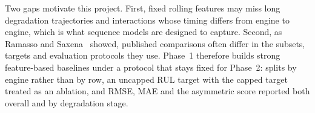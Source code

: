 Two gaps motivate this project. First, fixed rolling features may miss long degradation
trajectories and interactions whose timing differs from engine to engine, which is what
sequence models are designed to capture. Second, as Ramasso and
Saxena~\cite{Ramasso2014performance} showed, published comparisons often differ in the
subsets, targets and evaluation protocols they use. Phase~1 therefore builds strong
feature-based baselines under a protocol that stays fixed for Phase~2: splits by engine
rather than by row, an uncapped RUL target with the capped target treated as an
ablation, and RMSE, MAE and the asymmetric score reported both overall and by
degradation stage.
